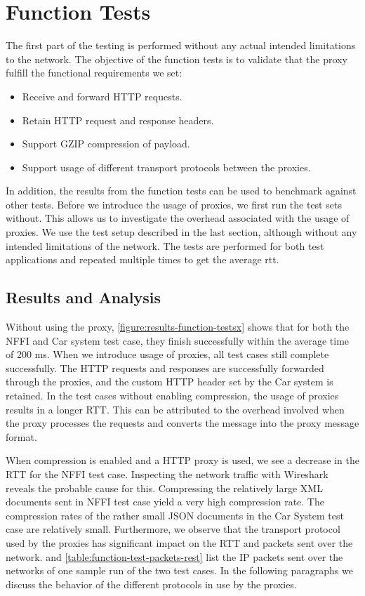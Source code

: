 \section{Function Tests}

The first part of the testing is performed without any actual intended
limitations to the network. The objective of the function tests is to validate
that the proxy fulfill the functional requirements we set:

\begin{itemize}
    \item Receive and forward HTTP requests.
    \item Retain HTTP request and response headers.
    \item Support GZIP compression of payload.
    \item Support usage of different transport protocols between the proxies.
\end{itemize}

 In addition, the results from the function tests can be used to benchmark
 against other tests. Before we introduce the usage of proxies, we first run the
 test sets without. This allows us to investigate the overhead associated with
 the usage of proxies. We use the test setup described in the last section,
 although without any intended limitations of the network. The tests are
 performed for both test applications and repeated multiple times to get the
 average \gls{rtt}.

\subsection{Results and Analysis}

Without using the proxy, \cref{figure:results-function-testsx} shows that for
both the NFFI and Car system test case, they finish successfully within the
average time of 200 ms. When we introduce usage of proxies, all test cases still
complete successfully. The HTTP requests and responses are successfully
forwarded through the proxies, and the custom HTTP header set by the Car system is
retained. In the test cases without enabling compression, the usage of proxies
results in a longer RTT. This can be attributed to the overhead involved when
the proxy processes the requests and converts the message into the proxy message
format.

When compression is enabled and a HTTP proxy is used, we see a decrease in the
RTT for the NFFI test case. Inspecting the network traffic with Wireshark
reveals the probable cause for this. Compressing the relatively large XML
documents sent in NFFI test case yield a very high compression rate. The
compression rates of the rather small JSON documents in the Car System test case
are relatively small. Furthermore, we observe that the transport protocol used
by the proxies has significant impact on the RTT and packets sent over the
network.  and
\cref{table:function-test-packets-rest} list the IP packets sent over the
networks of one sample run of the two test cases. In the following
paragraphs we discuss the behavior of the different protocols in use by the
proxies.

